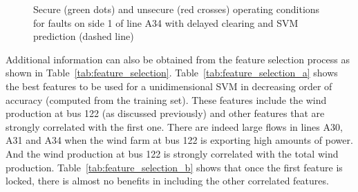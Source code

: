\begin{figure}
\centering
{}
\caption{Secure (green dots) and unsecure (red crosses) operating conditions for faults on side 1 of line A34 with delayed clearing and SVM prediction (dashed line)}
\label{fig:A34_SVM}
\end{figure}

Additional information can also be obtained from the feature selection process as shown in Table~\ref{tab:feature_selection}. Table~\ref{tab:feature_selection_a} shows the best features to be used for a unidimensional SVM in decreasing order of accuracy (computed from the training set). These features include the wind production at bus 122 (as discussed previously) and other features that are strongly correlated with the first one. There are indeed large flows in lines A30, A31 and A34 when the wind farm at bus 122 is exporting high amounts of power. And the wind production at bus 122 is strongly correlated with the total wind production. Table~\ref{tab:feature_selection_b} shows that once the first feature is locked, there is almost no benefits in including the other correlated features.

